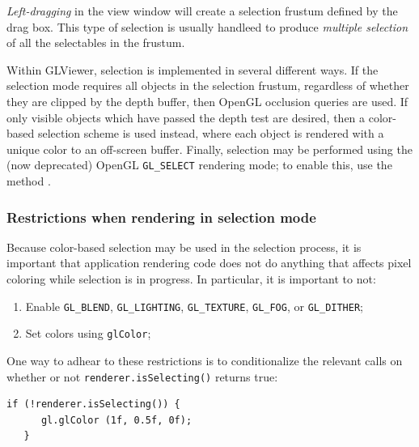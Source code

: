 \documentclass{article}
\begin{document}
{\it Left-dragging} in the view window will create a selection frustum
defined by the drag box.  This type of selection is usually handleed
to produce {\it multiple selection} of all the selectables in the
frustum.


Within GLViewer, selection is implemented in several different ways.
If the selection mode requires all objects in the selection frustum,
regardless of whether they are clipped by the depth buffer, then
OpenGL occlusion queries are used. If only visible objects which have
passed the depth test are desired, then a color-based selection scheme
is used instead, where each object is rendered with a unique color to
an off-screen buffer. Finally, selection may be performed using the
(now deprecated) OpenGL {\tt GL\_SELECT} rendering mode; to enable
this, use the method 
.

\subsubsection{Restrictions when rendering in selection mode}

Because color-based selection may be used in the selection process, it
is important that application rendering code does not do anything that
affects pixel coloring while selection is in progress. In particular,
it is important to not:

\begin{enumerate}

\item Enable {\tt GL\_BLEND}, {\tt GL\_LIGHTING}, {\tt GL\_TEXTURE}, 
{\tt GL\_FOG}, or {\tt GL\_DITHER};

\item Set colors using {\tt glColor};

\end{enumerate}


One way to adhear to these restrictions is to conditionalize the
relevant calls on whether or not {\tt renderer.isSelecting()} returns
true:
\begin{lstlisting}[]
   if (!renderer.isSelecting()) {
      gl.glColor (1f, 0.5f, 0f);
   }
\end{lstlisting}
\end{document}
